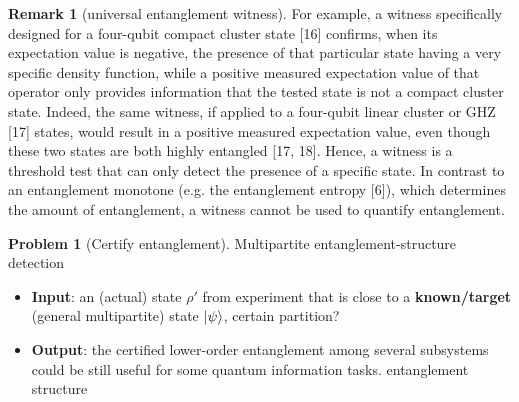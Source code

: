 \documentclass[
10pt,
aps,
pra,
linenumbers,
floatfix,
]{revtex4-2}
\theoremstyle{plain}
\theoremstyle{definition}
\newtheorem{remark}{Remark}
\newtheorem{problem}{Problem}
\newcommand{\dm}{\rho}
\begin{document}
\begin{remark}[universal entanglement witness]
	\cite{sciaraUniversalPartiteLevel2019}
	For example, a witness specifically designed for a four-qubit compact cluster state [16] conﬁrms, when its expectation value is negative, the presence of that particular state having a very speciﬁc density function, while a positive measured expectation value of that operator only provides information that the tested state is not a compact cluster state. 
	Indeed, the same witness, if applied to a four-qubit linear cluster or GHZ [17] states, would result in a positive measured expectation value, even though these two states are both highly entangled [17, 18]. 
	Hence, a witness is a threshold test that can only detect the presence of a speciﬁc state. 
	In contrast to an entanglement monotone (e.g. the entanglement entropy [6]), which determines the amount of entanglement, a witness cannot be used to quantify entanglement.	
\end{remark}
\begin{problem}[Certify entanglement]
	Multipartite entanglement-structure detection
	\begin{itemize}
		\item \textbf{Input}: an (actual) state $\dm'$ from experiment that is close to a \textbf{known/target} (general multipartite) state $\ket{\psi}$,
		certain partition?
		\item \textbf{Output}: the certified lower-order entanglement among several subsystems could be still useful for some quantum information tasks.
		entanglement structure
	\end{itemize}
\end{problem}
\end{document}
